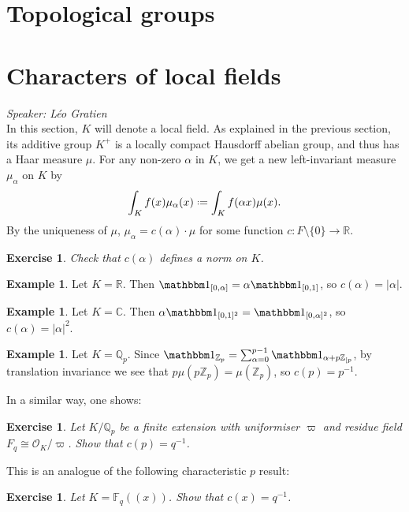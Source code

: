 \documentclass[11pt]{report}
\let\mc\mathcal
\newcommand{\1}{\mathbbm 1}
\newcommand{\Z}{\mathbb{Z}}
\newcommand{\Q}{\mathbb{Q}}
\newcommand{\R}{\mathbb{R}}
\newcommand{\F}{\mathbb{F}}
\newcommand{\C}{\mathbb{C}}
\renewcommand{\O}{\mc O}
\newcommand*{\defeq}{\mathrel{\vcenter{\baselineskip0.5ex \lineskiplimit0pt
      \hbox{\scriptsize.}\hbox{\scriptsize.}}}%
  =}
\theoremstyle{plain}
\newcounter{ex}
\newtheorem{exercise}[ex]{Exercise}
\theoremstyle{definition}
\newtheorem{example}[thm]{Example}
\theoremstyle{remark}
\numberwithin{equation}{section}
\begin{document}
\section{Topological groups}
\label{sec:topological-groups}


\section{Characters of local fields}
\label{sec:local-fields}
\emph{Speaker: Léo Gratien}\\

In this section, $K$ will denote a local field. As
explained in the previous section, its additive group $K^{+}$ is a
locally compact Hausdorff abelian group, and thus has a Haar measure
$\mu$. For any non-zero $\alpha $ in $K$, we get a new left-invariant measure
$\mu_{\alpha}$ on $K$ by
\begin{equation}
  \label{eq:32}
\int_{K} f(x)\mu_{\alpha}(x) \defeq \int_{K} f(\alpha x)\mu(x).
\end{equation}
By the uniqueness of $\mu$, $\mu_{\alpha} = c(\alpha)\cdot \mu$ for some function $c
\colon F \setminus \{0\} \to \R$.
\begin{exercise}
Check that $c(\alpha)$ defines a norm on $K$.
\end{exercise}

\begin{example}
Let $K = \R$. Then $\1_{[0,\alpha]} = \alpha \1_{[0,1]}$, so $c(\alpha) = |\alpha|$. 
\end{example}

\begin{example}
Let $K = \C$. Then $\alpha \1_{[0,1]^{2}} = \1_{[0,\alpha]^{2}}$, so $c(\alpha) = |\alpha|^{2}$. 
\end{example}

\begin{example}
  Let $K = \Q_{p}$. Since
  $\1_{\Z_{p}} = \sum_{\alpha=0}^{p-1} \1_{\alpha + p\Z_{[p}}$, by translation
  invariance we see that $p\mu(p\Z_{p}) =\mu(\Z_{p})$, so
  $c(p) = p^{-1}$.
\end{example}

In a similar way, one shows: 
\begin{exercise}
Let $K/\Q_{p}$ be a finite extension with uniformiser $\varpi$ and
residue field $F_{q} \cong \O_{K}/\varpi$. Show that $c(p)=  q^{-1}$. 
\end{exercise}

This is an analogue of the following characteristic $p$ result:
\begin{exercise}
Let $K = \F_{q}((x))$. Show that $c(x) = q^{-1}$. 
\end{exercise}
\end{document}
